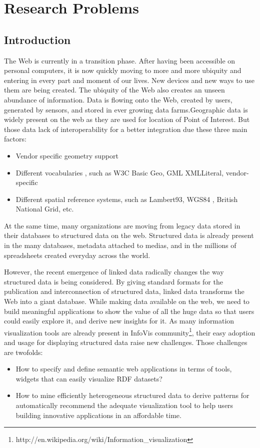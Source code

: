 \documentclass[a4paper,11pt]{report}
\begin{document}


\chapter{Research Problems}

\section{Introduction}
The Web is currently in a transition phase. After having been accessible on personal computers, it is now 
quickly moving to more and more ubiquity and entering in every part and moment of our lives. New 
devices and new ways to use them are being created. The ubiquity of the Web also creates an unseen 
abundance of information. Data is flowing onto the Web, created by users, generated by sensors, and 
stored in ever growing data farms.Geographic data is widely present on the web as they are used for location 
of Point of Interest. But those data lack of interoperability for a better integration due these three main factors:
\begin{itemize}
\item Vendor specific geometry support
\item Different vocabularies , such as W3C Basic Geo, GML XMLLiteral, vendor-specific
\item Different spatial reference systems, such as Lambert93, WGS84 , British National Grid, etc.
\end{itemize}
At the same time, many organizations are moving from legacy data stored in their databases
to structured data on the web. Structured data is already present in the many databases, metadata attached to medias, and in the millions of spreadsheets created everyday across the world. 

However, the recent emergence of linked data radically changes the way structured data is being considered. By giving standard formats for the publication and interconnection of structured data, linked data transforms the Web into a giant database. While making data available on the web, we need to build meaningful applications to show the value of all the huge data so that users could easily explore it, and derive new insights for it. As many information visualization tools are already present in InfoVis community\footnote{http://en.wikipedia.org/wiki/Information\_visualization}, their easy adoption and usage for displaying structured data raise new challenges. Those challenges are twofolds:
\begin{itemize}
\item How to specify and define semantic web applications in terms of tools, widgets that can easily visualize RDF datasets?
\item How to mine efficiently heterogeneous structured data to derive patterns for automatically recommend the adequate visualization tool to help users building innovative applications in an affordable time.
\end{itemize}
\end{document}
